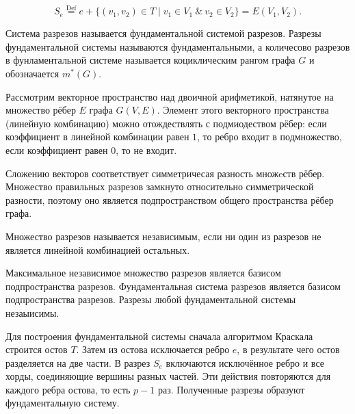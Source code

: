 \[
S_{e} \stackrel{\text{Def}}{=} e + \{(v_1, v_2) \in T \mid v_1 \in V_1~\&~v_2 \in V_2\} = E(V_1, V_2).
\]

Система разрезов называется фундаментальной системой разрезов. Разрезы фундаментальной системы называются фундаментальными, а количесово разрезов в фунламентальной системе называется коциклическим рангом графа $G$ и обозначается $m^{*}(G)$.

Рассмотрим векторное пространство над двоичной арифметикой, натянутое на множество рёбер $E$ графа $G(V, E)$. Элемент этого векторного пространства (линейную комбинацию) можно отождествлять с подмиодеством рёбер: если коэффициент в линейной комбинации равен $1$, то ребро входит в подмножество, если коэффициент равен $0$, то не входит.

Сложению векторов соответствует симметричесая разность множeств рёбер. Множество правильных разрезов замкнуто относительно симметрической разности, поэтому оно является подпространством общего пространства рёбер графа.

Множество разрезов называется независимым, если ни один из разрезов не является линейной комбинацией остальных.

Максимальное независимое множество разрезов является базисом подпространства разрезов. Фундаментальная система разрезов является базисом подпространства разрезов. Разрезы любой фундаментальной системы незаыисимы.

Для построения фундаментальной системы сначала алгоритмом Краскала строится остов $T$. Затем из остова исключается ребро $e$, в результате чего остов разделяется на две части. В разрез $S_e$ включаются исключённое ребро и все хорды, соединяющие вершины разных частей. Эти действия повторяются для каждого ребра остова, то есть $p-1$ раз. Полученные разрезы образуют фундаментальную систему.
